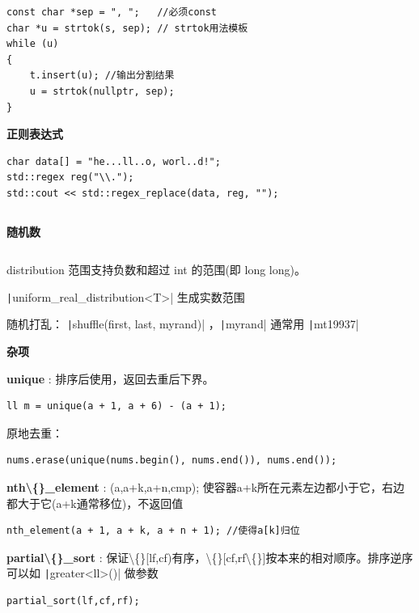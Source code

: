 \documentclass[twocolumn,10pt]{ctexart}
\makeatletter
\newcommand{\hfive}[1]{\par\addvspace{6pt}\@afterindentfalse
  {\noindent\bfseries\normalsize #1}\par\nobreak\vspace{2pt}}
\makeatother
\begin{document}
\begin{verbatim}
const char *sep = ", ";   //必须const
char *u = strtok(s, sep); // strtok用法模板
while (u)
{
    t.insert(u); //输出分割结果
    u = strtok(nullptr, sep);
}
\end{verbatim}

\hfive{正则表达式}

\begin{verbatim}
char data[] = "he...ll..o, worl..d!";
std::regex reg("\\.");
std::cout << std::regex_replace(data, reg, "");
\end{verbatim}

\inputminted{cpp}{code/ext_079.cpp}

\hfive{随机数}

\inputminted{cpp}{code/ext_080.cpp}

distribution 范围支持负数和超过 int 的范围(即 long long)。

\texttt|uniform_real_distribution<T>| 生成实数范围

随机打乱：  \texttt|shuffle(first, last, myrand)| ，\texttt|myrand| 通常用 \texttt|mt19937|

\hfive{杂项}

\textbf{unique} : 排序后使用，返回去重后下界。

\begin{verbatim}
ll m = unique(a + 1, a + 6) - (a + 1);
\end{verbatim}

原地去重：

\begin{verbatim}
nums.erase(unique(nums.begin(), nums.end()), nums.end());
\end{verbatim}

\textbf{nth\textbackslash\{\}\_element} : (a,a+k,a+n,cmp); 使容器a+k所在元素左边都小于它，右边都大于它(a+k通常移位)，不返回值

\begin{verbatim}
nth_element(a + 1, a + k, a + n + 1); //使得a[k]归位
\end{verbatim}

\textbf{partial\textbackslash\{\}\_sort} : 保证\textbackslash\{\}[lf,cf)有序，\textbackslash\{\}[cf,rf\textbackslash\{\}]按本来的相对顺序。排序逆序可以如 \texttt|greater<ll>()| 做参数

\begin{verbatim}
partial_sort(lf,cf,rf);
\end{verbatim}
\end{document}
